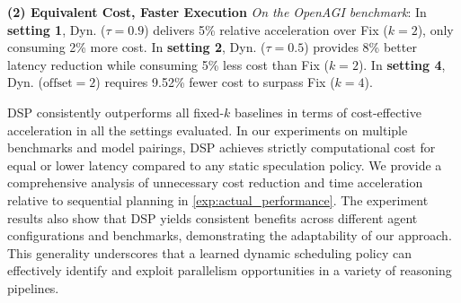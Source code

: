 \textbf{(2) Equivalent Cost, Faster Execution} \emph{On the OpenAGI benchmark}: In \textbf{setting 1}, Dyn. ($\tau=0.9$) delivers 5\% relative acceleration over Fix ($k=2$), only consuming 2\% more cost.  
In \textbf{setting 2}, Dyn. ($\tau=0.5$) provides 8\% better latency reduction while consuming 5\% less cost than Fix ($k=2$).
In \textbf{setting 4}, Dyn. ($\text{offset}=2$) requires 9.52\% fewer cost to surpass Fix ($k=4$).

DSP consistently outperforms all fixed-$k$ baselines in terms of cost-effective acceleration in all the settings evaluated. In our experiments on multiple benchmarks and model pairings, DSP achieves strictly computational cost for equal or lower latency compared to any static speculation policy. We provide a comprehensive analysis of unnecessary cost reduction and time acceleration relative to sequential planning in \cref{exp:actual_performance}. The experiment results also show that DSP yields consistent benefits across different agent configurations and benchmarks, demonstrating the adaptability of our approach. 
This generality underscores that a learned dynamic scheduling policy can effectively identify and exploit parallelism opportunities in a variety of reasoning pipelines. 






